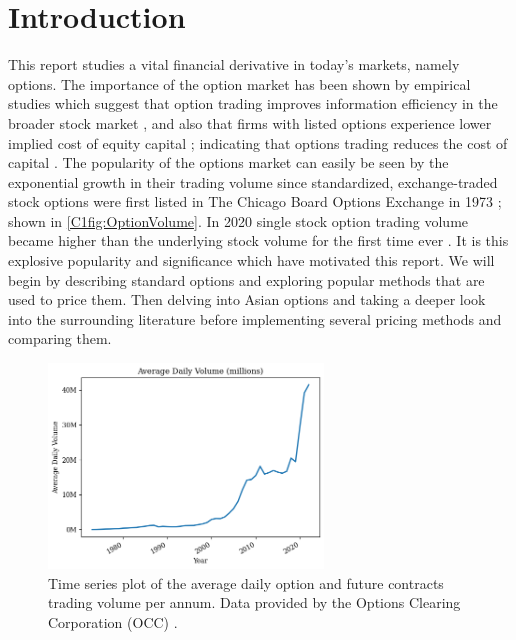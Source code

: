 \chapter{Introduction}

This report studies a vital financial derivative in today's markets, namely options. The importance of the option market has been shown by empirical studies which suggest that option trading improves information efficiency in the broader stock market \cite{PanInfoEffic,li2021effect}, and also that firms with listed options experience lower implied cost of equity capital \cite{naikerLowEquity}; indicating that options trading reduces the cost of capital \cite{li2021effect}. The popularity of the options market can easily be seen by the exponential growth in their trading volume since standardized, exchange-traded stock options were first listed in The Chicago Board Options Exchange in 1973 \cite{markham2002financial}; shown in \autoref{C1fig:OptionVolume}. In 2020 single stock option trading volume became higher than the underlying stock volume for the first time ever \cite{yahooOptions}. 
\nline
It is this explosive popularity and significance which have motivated this report. We will begin by describing standard options and exploring popular methods that are used to price them. Then delving into Asian options and taking a deeper look into the surrounding literature before implementing several pricing methods and comparing them.

\begin{figure}[H]
    \centering
    \includegraphics[width=0.65\textwidth]{Chapters/C1/plots/OptionVolume.png}
    \caption{Time series plot of the average daily option and future contracts trading volume per annum. Data provided by the Options Clearing Corporation (OCC) \cite{THEOCC}. 
    }
    \label{C1fig:OptionVolume}
\end{figure}


